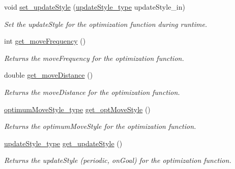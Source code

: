 \begin{CompactItemize}
void \hyperlink{classFunction_43f22a89270d1fb80a9e5cd97199edf8}{set\_\-updateStyle} (\hyperlink{optfunctions_8h_42f59cdfb9d4008508628c2db63d1233}{updateStyle\_\-type} updateStyle\_\-in)
\begin{CompactList}\small\item\em Set the updateStyle for the optimization function during runtime. \item\end{CompactList}\item 
int \hyperlink{classFunction_56b76e8cc2d8fc7abb79f1e0110597fb}{get\_\-moveFrequency} ()
\begin{CompactList}\small\item\em Returns the moveFrequency for the optimization function. \item\end{CompactList}\item 
double \hyperlink{classFunction_ea2630ebec2607a174840b321597a944}{get\_\-moveDistance} ()
\begin{CompactList}\small\item\em Returns the moveDistance for the optimization function. \item\end{CompactList}\item 
\hyperlink{optfunctions_8h_ba5a89b2e159110d7dd33bced19b11ce}{optimumMoveStyle\_\-type} \hyperlink{classFunction_33fd72428c3ffe097f282d5172b6a512}{get\_\-optMoveStyle} ()
\begin{CompactList}\small\item\em Returns the optimumMoveStyle for the optimization function. \item\end{CompactList}\item 
\hyperlink{optfunctions_8h_42f59cdfb9d4008508628c2db63d1233}{updateStyle\_\-type} \hyperlink{classFunction_dfeaef589691aea723b6b713763b37be}{get\_\-updateStyle} ()
\begin{CompactList}\small\item\em Returns the updateStyle (periodic, onGoal) for the optimization function. \item\end{CompactList}\end{CompactItemize}
